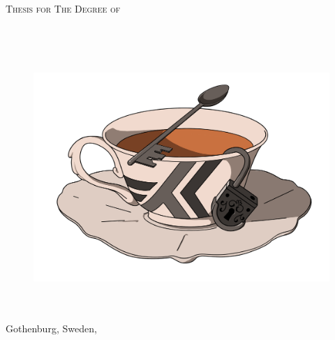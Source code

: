 
\thispagestyle{empty} %
\begin{center}
  \textsc{Thesis for The Degree of \degreetitle}\\
\end{center}

\vspace{4cm}

\begin{center} {\LARGE \textbf{\mytitle}}\\
\ifx\mysubtitle\undefined
\else
  \vspace{4mm}
  \textit{\large\mysubtitle}
\fi
\end{center}

\ifx\mysubtitle\undefined
\vspace{5mm}
\else
\vspace{2mm}
\fi

\begin{center}
\textsc{\large\authorname} \\
\end{center}

\begin{figure}[h]
  \centering
  \includegraphics[scale=0.3]{graphics/HasTee_transparent.png}
\end{figure}

\vfill

\begin{center}
\textit{\mydepartment}\\
\textsc{\chalIgu}\\
Gothenburg, Sweden, \currentyear \\
\end{center}

